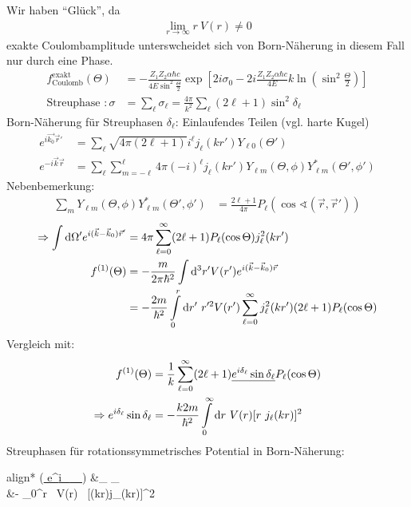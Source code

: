 	Wir haben ``Glück'', da
		\begin{align*}
			\underset{r \rightarrow \infty}{\lim} r ~V(r) \neq 0
		\end{align*}
	exakte Coulombamplitude unterswcheidet sich von Born-Näherung in diesem Fall nur durch eine Phase.
		\begin{align*}
			f^{\text{exakt}}_{\text{Coulomb}} (\Theta) 
			&= -\frac{Z_1 Z_2 \alpha \hbar c}{4 E \sin^2 \frac{\Theta}{2}} 
			\exp \left[ 2 i \sigma_0 - 
			2 i \frac{Z_1 Z_2 \alpha \hbar c}{4 E} k 
			\ln \left(\sin^2 \frac{\Theta}{2} \right)
			\right] \\
			\text{Streuphase }: \sigma 
			&= \sum_\ell \sigma_\ell 
			= \frac{4 \pi}{k^2} \sum_\ell (2 \ell + 1) \sin^2 \delta_\ell
		\end{align*}
	Born-Näherung für Streuphasen $\delta_\ell$: Einlaufendes Teilen (vgl. harte Kugel)
		\begin{align*}
			e^{i \vec{k_0} \vec{r}'} 
			&= \sum_\ell \sqrt{4 \pi (2 \ell + 1)} 
			i^\ell j_\ell (kr') Y_{\ell 0} (\Theta') \\
			e^{-i \vec{k} \vec{r}} 
			&= \sum_\ell \sum_{m = -\ell}^\ell
			4 \pi (-i)^\ell j_\ell (kr') Y_{\ell m} (\Theta, \phi) Y^*_{\ell m} (\Theta', \phi')
		\end{align*}
	Nebenbemerkung:
		\begin{align*}
			\sum_m Y_{\ell m} (\Theta, \phi) Y^*_{\ell m} (\Theta', \phi') 
			&= \frac{2 \ell + 1}{4 \pi} P_\ell (\cos \sphericalangle (\vec{r},\vec{r}'))
		\end{align*}
		\begin{align*}
			\Rightarrow \int \mathrm{d} \Omega' 
			e^{i(\vec{k}-\vec{k}_0) \vec{r}'} 
			&= 4 \pi \sum_{\ell=0}^\infty (2\ell + 1)
			P_\ell (\cos \Theta) j_\ell^2 (kr') \\
			f^{(1)} (\Theta) 
			&= -\frac{m}{2 \pi \hbar^2} 
			\int \mathrm{d}^3 r' V(r') e^{i(\vec{k}-\vec{k}_0)\vec{r}} \\
			&= - \frac{2 m}{\hbar^2}
			\int \limits_0^r \mathrm{d} r' ~r'^2 V(r') 
			\sum_{\ell = 0}^\infty j_\ell^2 (k r') 
			(2 \ell + 1) P_\ell (\cos \Theta) 
		\end{align*}
	Vergleich mit:
		\begin{align*}
			f^{(1)}(\Theta) 
			&= \frac{1}{k} \sum_{\ell=0}^{\infty} (2\ell + 1)
			\underline{e^{i\delta_\ell} \sin \delta_\ell} P_\ell (\cos \Theta) \\
			\Rightarrow e^{i\delta_\ell} \sin \delta_\ell
			&= - \frac{k 2 m}{\hbar^2} 
			\int \limits_0^\infty \mathrm{d} r ~V(r) 
			[r ~j_\ell(kr)]^2
		\end{align*}
	Streuphasen für rotationssymmetrisches Potential in Born-Näherung:
		\begin{empheq}[box=\boxed]{align*}
			 (\underline{ e^{i\delta_\ell} \sin \delta_\ell})
			&\approx \delta_\ell
			\leftarrow \delta_\ell {} \\
			&\approx -
			\int \limits_0^\infty \diff r ~V(r) 
			~[(kr)j_\ell(kr)]^2
		\end{empheq}